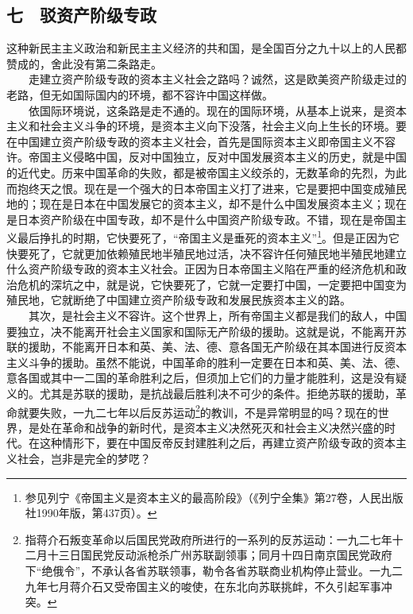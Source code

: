 \documentclass[cn,11pt,chinese]{elegantbook}
\def\myformat#1{\hfil\hfil #1}
\begin{document}
\subsection*{\myformat{七　驳资产阶级专政}}
这种新民主主义政治和新民主主义经济的共和国，是全国百分之九十以上的人民都赞成的，舍此没有第二条路走。\\
　　走建立资产阶级专政的资本主义社会之路吗？诚然，这是欧美资产阶级走过的老路，但无如国际国内的环境，都不容许中国这样做。\\
　　依国际环境说，这条路是走不通的。现在的国际环境，从基本上说来，是资本主义和社会主义斗争的环境，是资本主义向下没落，社会主义向上生长的环境。要在中国建立资产阶级专政的资本主义社会，首先是国际资本主义即帝国主义不容许。帝国主义侵略中国，反对中国独立，反对中国发展资本主义的历史，就是中国的近代史。历来中国革命的失败，都是被帝国主义绞杀的，无数革命的先烈，为此而抱终天之恨。现在是一个强大的日本帝国主义打了进来，它是要把中国变成殖民地的；现在是日本在中国发展它的资本主义，却不是什么中国发展资本主义；现在是日本资产阶级在中国专政，却不是什么中国资产阶级专政。不错，现在是帝国主义最后挣扎的时期，它快要死了，“帝国主义是垂死的资本主义”\footnote[14]{ 参见列宁《帝国主义是资本主义的最高阶段》（《列宁全集》第27卷，人民出版社1990年版，第437页）。}。但是正因为它快要死了，它就更加依赖殖民地半殖民地过活，决不容许任何殖民地半殖民地建立什么资产阶级专政的资本主义社会。正因为日本帝国主义陷在严重的经济危机和政治危机的深坑之中，就是说，它快要死了，它就一定要打中国，一定要把中国变为殖民地，它就断绝了中国建立资产阶级专政和发展民族资本主义的路。\\
　　其次，是社会主义不容许。这个世界上，所有帝国主义都是我们的敌人，中国要独立，决不能离开社会主义国家和国际无产阶级的援助。这就是说，不能离开苏联的援助，不能离开日本和英、美、法、德、意各国无产阶级在其本国进行反资本主义斗争的援助。虽然不能说，中国革命的胜利一定要在日本和英、美、法、德、意各国或其中一二国的革命胜利之后，但须加上它们的力量才能胜利，这是没有疑义的。尤其是苏联的援助，是抗战最后胜利决不可少的条件。拒绝苏联的援助，革命就要失败，一九二七年以后反苏运动\footnote[15]{ 指蒋介石叛变革命以后国民党政府所进行的一系列的反苏运动：一九二七年十二月十三日国民党反动派枪杀广州苏联副领事；同月十四日南京国民党政府下“绝俄令”，不承认各省苏联领事，勒令各省苏联商业机构停止营业。一九二九年七月蒋介石又受帝国主义的唆使，在东北向苏联挑衅，不久引起军事冲突。}的教训，不是异常明显的吗？现在的世界，是处在革命和战争的新时代，是资本主义决然死灭和社会主义决然兴盛的时代。在这种情形下，要在中国反帝反封建胜利之后，再建立资产阶级专政的资本主义社会，岂非是完全的梦呓？\\
\end{document}
